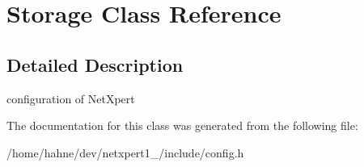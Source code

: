 \hypertarget{classStorage}{}\section{Storage Class Reference}
\label{classStorage}


\subsection{Detailed Description}
configuration of Net\+Xpert 

The documentation for this class was generated from the following file\+:\begin{DoxyCompactItemize}
\item 
/home/hahne/dev/netxpert1\+\_/include/config.\+h\end{DoxyCompactItemize}
